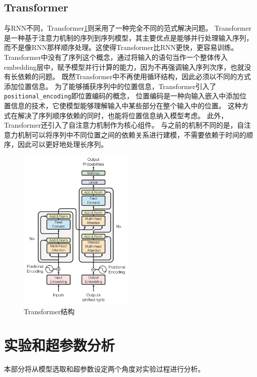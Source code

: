 \documentclass[]{ctexart}
\begin{document}
\subsection{Transformer}
与RNN不同，Transformer\ref{transformer}则采用了一种完全不同的范式解决问题。
Transformer是一种基于注意力机制的序列到序列模型，其主要优点是能够并行处理输入序列，而不是像RNN那样顺序处理。这使得Transformer比RNN更快，更容易训练。
Transformer中没有了序列这个概念，通过将输入的语句当作一个整体传入embedding层中，赋予模型并行计算的能力，因为不再强调输入序列次序，也就没有长依赖的问题。
既然Transformer中不再使用循环结构，因此必须以不同的方式添加位置信息。
为了能够捕获序列中的位置信息，Transformer引入了\texttt{positional\_encoding}即位置编码的概念，
位置编码是一种向输入嵌入中添加位置信息的技术，它使模型能够理解输入中某些部分在整个输入中的位置。
这种方式在解决了序列顺序依赖的同时，也能将位置信息纳入模型考虑。
此外，Transformer还引入了自注意力机制作为核心组件。
与之前的机制不同的是，自注意力机制可以将序列中不同位置之间的依赖关系进行建模，不需要依赖于时间的顺序，因此可以更好地处理长序列。
\begin{figure}[htb]
  \centering
  \includegraphics[width=0.5\textwidth]{asset/a_transformer.png}
  \caption{Transformer结构}
  \label{transformer}
\end{figure}

\newpage
\section{实验和超参数分析}
本部分将从模型选取和超参数设定两个角度对实验过程进行分析。
\end{document}
